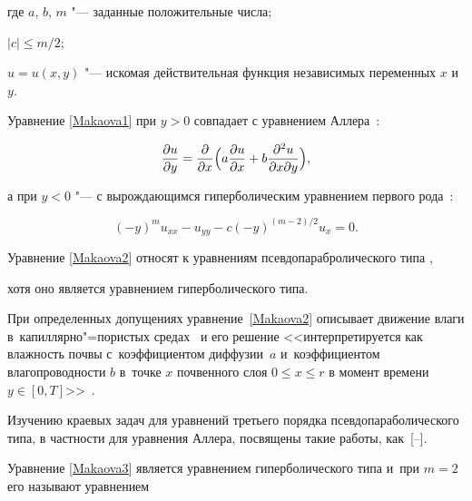 где $a$, $b$, $m$  "--- заданные положительные числа;

$ |c |\leq m/2$;

$u=u(x,y)$ "--- искомая действительная функция независимых переменных $x$ и $y$.



Уравнение \eqref{Makaova1} при $y>0$  совпадает с  уравнением Аллера~\cite{Hallaire_1}:

\begin{equation}

\label{Makaova2} 

\frac{\partial u}{\partial y}

=\frac{\partial }{\partial x}

\Bigl(

a\frac{\partial u}{\partial x}

+b\frac{\partial^2 u}{\partial x \partial y}

\Bigr), 

\end{equation}

а при $y<0$  "--- с  вырождающимся гиперболическим уравнением первого рода~\cite{Smirnov_2}:

\begin{equation}

\label{Makaova3} 

(-y)^m u_{xx}-u_{yy}-c(-y)^{({m-2})/{2}}u_x=0.

\end{equation}



Уравнение \eqref{Makaova2} относят к уравнениям псевдопарабролического типа \cite{Showalter_3}, 

хотя оно является уравнением гиперболического типа. 

При определенных допущениях уравнение~\eqref{Makaova2} описывает движение влаги в~капиллярно"=пористых средах~\cite{Chudnovsky_4} и  его решение <<интерпретируется как влажность почвы с~коэффициентом диффузии~$a$ и~коэффициентом влагопроводности $b$ в~точке $x$ почвенного слоя $0\leq x \leq r$ в момент времени $y \in [0,T]$>>~\cite{Nakhushev_5}.  

Изучению краевых задач для уравнений третьего порядка псевдопараболического типа, в частности для уравнения Аллера,  посвящены такие работы, как~[--]. 



Уравнение \eqref{Makaova3} является  уравнением гиперболического типа и~при $m=2$ его называют уравнением 


